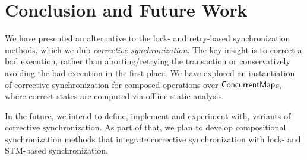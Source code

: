 \section{Conclusion and Future Work}

We have presented an alternative to the lock- and retry-based synchronization methods, which we dub \emph{corrective synchronization}. The key insight is to correct a bad execution, rather than aborting/retrying the transaction or conservatively avoiding the bad execution in the first place. We have explored an instantiation of corrective synchronization for composed operations over ${\sf ConcurrentMap}$s, where correct states are computed via offline static analysis.

In the future, we intend to define, implement and experiment with, variants of corrective synchronization. As part of that, we plan to develop compositional synchronization methods that integrate corrective synchronization with lock- and STM-based synchronization.

